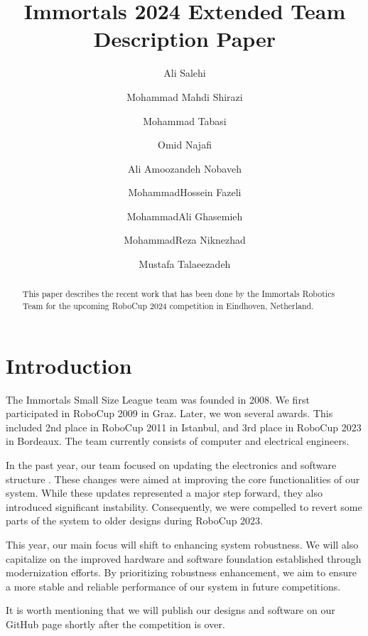 \documentclass[runningheads]{llncs}
\begin{document}
%
\title{Immortals 2024 Extended Team Description Paper}

\author{Ali Salehi \and
Mohammad Mahdi Shirazi \and
Mohammad Tabasi \and
Omid Najafi \and
Ali Amoozandeh Nobaveh \and
MohammadHossein Fazeli \and
MohammadAli Ghasemieh \and
MohammadReza Niknezhad \and
Mustafa Talaeezadeh}
%
%
%
\maketitle              %
%
\begin{abstract}
This paper describes the recent work that has been done by the Immortals Robotics Team for the upcoming RoboCup 2024 competition in Eindhoven, Netherland.

\end{abstract}

\section{Introduction}
The Immortals Small Size League team was founded in 2008. We first participated in RoboCup 2009 in Graz. Later, we won several awards. This included 2nd place in RoboCup 2011 in Istanbul, and 3rd place in RoboCup 2023 in Bordeaux. The team currently consists of computer and electrical engineers.

In the past year, our team focused on updating the electronics and software structure \cite{ref_ETDP2023}. These changes were aimed at improving the core functionalities of our system. While these updates represented a major step forward, they also introduced significant instability. Consequently, we were compelled to revert some parts of the system to older designs during RoboCup 2023.

This year, our main focus will shift to enhancing system robustness. We will also capitalize on the improved hardware and software foundation established through modernization efforts. By prioritizing robustness enhancement, we aim to ensure a more stable and reliable performance of our system in future competitions.
 
It is worth mentioning that we will publish our designs and software on our GitHub page \cite{ref_github} shortly after the competition is over.
\end{document}

